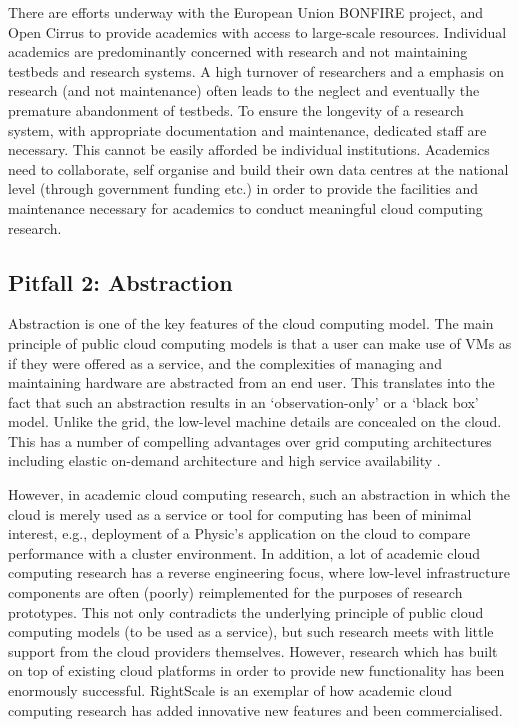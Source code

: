\documentclass[letterpaper,twocolumn,10pt]{article}
\begin{document}
There are efforts underway with the European Union BONFIRE \cite{BONFIRE} project, and Open Cirrus \cite{opencirrus} to provide academics with access to large-scale resources. Individual academics are predominantly concerned with research and not maintaining testbeds and research systems. A high turnover of researchers and a emphasis on research (and not maintenance) often leads to the neglect and eventually the premature abandonment of testbeds. To ensure the longevity of a research system, with appropriate documentation and maintenance, dedicated staff are necessary. This cannot be easily afforded be individual institutions. Academics need to collaborate, self organise and build their own data centres at the national level (through government funding etc.) in order to provide the facilities and maintenance necessary for academics to conduct meaningful cloud computing research. 





\subsection*{Pitfall 2: Abstraction}
Abstraction is one of the key features of the cloud computing model. The main principle of public cloud computing models is that a user can make use of VMs as if they were offered as a service, and the complexities of managing and maintaining hardware are abstracted from an end user. This translates into the fact that such an abstraction results in an `observation-only' or a `black box' model. Unlike the grid, the low-level machine details are concealed on the cloud. This has a number of compelling advantages over grid computing architectures including elastic on-demand architecture and high service availability \cite{cloudcompared-2}.

However, in academic cloud computing research, such an abstraction in which the cloud is merely used as a service or tool for computing has been of minimal interest, e.g., deployment of a Physic's application on the cloud to compare performance with a cluster environment. In addition, a lot of academic cloud computing research has a reverse engineering focus, where low-level infrastructure components are often (poorly) reimplemented for the purposes of research prototypes. This not only contradicts the underlying principle of public cloud computing models (to be used as a service), but such research meets with little support from the cloud providers themselves. However, research which has built on top of existing cloud platforms in order to provide new functionality has been enormously successful. RightScale \cite{rightscale} is an exemplar of how academic cloud computing research has added innovative new features and been commercialised. 
\end{document}
